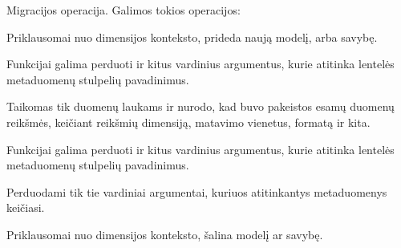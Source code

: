 \documentclass[letterpaper,10pt,lithuanian]{sphinxmanual}
\begin{document}
\begin{fulllineitems}
\label{\detokenize{dimensijos:migrate.prepare}}
\pysigstartsignatures
\pysigline
{}
\pysigstopsignatures
\sphinxAtStartPar
Migracijos operacija. Galimos tokios operacijos:

\begin{fulllineitems}
\label{\detokenize{dimensijos:migrate.create}}
\pysigstartsignatures
\pysiglinewithargsret
{}
{}
{}
\pysigstopsignatures
\sphinxAtStartPar
Priklausomai nuo dimensijos konteksto, prideda naują modelį, arba
savybę.

\sphinxAtStartPar
Funkcijai galima perduoti  ir kitus vardinius argumentus,
kurie atitinka {\hyperref[\detokenize{savokos:term-DSA}]{}} lentelės metaduomenų stulpelių
pavadinimus.

\end{fulllineitems}


\begin{fulllineitems}
\label{\detokenize{dimensijos:migrate.update}}
\pysigstartsignatures
\pysiglinewithargsret
{}
{}
{}
\pysigstopsignatures
\sphinxAtStartPar
Taikomas tik duomenų laukams ir nurodo, kad buvo pakeistos esamų
duomenų reikšmės, keičiant reikšmių dimensiją, matavimo vienetus,
formatą ir kita.

\sphinxAtStartPar
Funkcijai galima perduoti  ir kitus vardinius argumentus,
kurie atitinka {\hyperref[\detokenize{savokos:term-DSA}]{}} lentelės metaduomenų stulpelių
pavadinimus.

\sphinxAtStartPar
Perduodami tik tie vardiniai argumentai, kuriuos atitinkantys
metaduomenys keičiasi.

\end{fulllineitems}


\begin{fulllineitems}
\label{\detokenize{dimensijos:migrate.delete}}
\pysigstartsignatures
\pysiglinewithargsret
{}
{}
{}
\pysigstopsignatures
\sphinxAtStartPar
Priklausomai nuo dimensijos konteksto, šalina modelį ar savybę.


\end{fulllineitems}
\end{fulllineitems}
\end{document}
